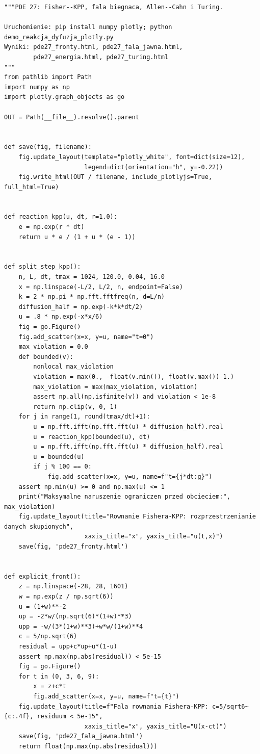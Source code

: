 \begin{lstlisting}[style=pythonpde,caption={Fale reakcji--dyfuzji, energia i niestabilność Turinga (Plotly)},label={code:pde27-plotly}]
"""PDE 27: Fisher--KPP, fala biegnaca, Allen--Cahn i Turing.

Uruchomienie: pip install numpy plotly; python demo_reakcja_dyfuzja_plotly.py
Wyniki: pde27_fronty.html, pde27_fala_jawna.html,
        pde27_energia.html, pde27_turing.html
"""
from pathlib import Path
import numpy as np
import plotly.graph_objects as go

OUT = Path(__file__).resolve().parent


def save(fig, filename):
    fig.update_layout(template="plotly_white", font=dict(size=12),
                      legend=dict(orientation="h", y=-0.22))
    fig.write_html(OUT / filename, include_plotlyjs=True, full_html=True)


def reaction_kpp(u, dt, r=1.0):
    e = np.exp(r * dt)
    return u * e / (1 + u * (e - 1))


def split_step_kpp():
    n, L, dt, tmax = 1024, 120.0, 0.04, 16.0
    x = np.linspace(-L/2, L/2, n, endpoint=False)
    k = 2 * np.pi * np.fft.fftfreq(n, d=L/n)
    diffusion_half = np.exp(-k*k*dt/2)
    u = .8 * np.exp(-x*x/6)
    fig = go.Figure()
    fig.add_scatter(x=x, y=u, name="t=0")
    max_violation = 0.0
    def bounded(v):
        nonlocal max_violation
        violation = max(0., -float(v.min()), float(v.max())-1.)
        max_violation = max(max_violation, violation)
        assert np.all(np.isfinite(v)) and violation < 1e-8
        return np.clip(v, 0, 1)
    for j in range(1, round(tmax/dt)+1):
        u = np.fft.ifft(np.fft.fft(u) * diffusion_half).real
        u = reaction_kpp(bounded(u), dt)
        u = np.fft.ifft(np.fft.fft(u) * diffusion_half).real
        u = bounded(u)
        if j % 100 == 0:
            fig.add_scatter(x=x, y=u, name=f"t={j*dt:g}")
    assert np.min(u) >= 0 and np.max(u) <= 1
    print("Maksymalne naruszenie ograniczen przed obcieciem:", max_violation)
    fig.update_layout(title="Rownanie Fishera-KPP: rozprzestrzenianie danych skupionych",
                      xaxis_title="x", yaxis_title="u(t,x)")
    save(fig, 'pde27_fronty.html')


def explicit_front():
    z = np.linspace(-28, 28, 1601)
    w = np.exp(z / np.sqrt(6))
    u = (1+w)**-2
    up = -2*w/(np.sqrt(6)*(1+w)**3)
    upp = -w/(3*(1+w)**3)+w*w/(1+w)**4
    c = 5/np.sqrt(6)
    residual = upp+c*up+u*(1-u)
    assert np.max(np.abs(residual)) < 5e-15
    fig = go.Figure()
    for t in (0, 3, 6, 9):
        x = z+c*t
        fig.add_scatter(x=x, y=u, name=f"t={t}")
    fig.update_layout(title=f"Fala rownania Fishera-KPP: c=5/sqrt6~{c:.4f}, residuum < 5e-15",
                      xaxis_title="x", yaxis_title="U(x-ct)")
    save(fig, 'pde27_fala_jawna.html')
    return float(np.max(np.abs(residual)))



\end{lstlisting}

